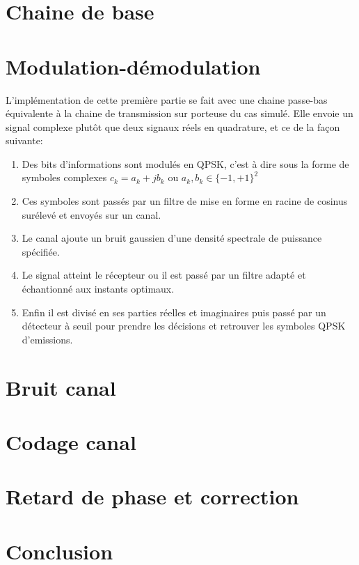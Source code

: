 \documentclass[a4paper,10pt]{article}
\begin{document}
\section{Chaine de base}



\section{Modulation-démodulation}
L'implémentation de cette première partie se fait avec une chaine passe-bas équivalente à la chaine de transmission sur porteuse du cas simulé. Elle envoie un signal complexe plutôt que deux signaux réels en quadrature, et ce de la façon suivante:
\begin{enumerate}
	\item Des bits d'informations sont modulés en QPSK, c'est à dire sous la forme de symboles complexes $c_k=a_k+jb_k$ ou $a_k,b_k \in \{-1,+1\}^2$
	\item Ces symboles sont passés par un filtre de mise en forme en racine de cosinus surélevé et envoyés sur un canal.
	\item Le canal ajoute un bruit gaussien d'une densité spectrale de puissance spécifiée.
	\item Le signal atteint le récepteur ou il est passé par un filtre adapté et échantionné aux instants optimaux.
	\item Enfin il est divisé en ses parties réelles et imaginaires puis passé par un détecteur à seuil pour prendre les décisions et retrouver les symboles QPSK d'emissions.
\end{enumerate}


\section{Bruit canal}

\section{Codage canal}

\section{Retard de phase et correction}

\section{Conclusion}
\end{document}
